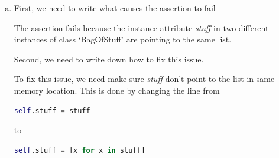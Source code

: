 \documentclass[12pt]{article}
\begin{document}
\begin{enumerate}[a.]
    \item

    First, we need to write what causes the assertion to fail

    \bigskip

    The assertion fails because the instance attribute \textit{stuff} in two
    different instances of class `BagOfStuff' are pointing to the same list.

    \bigskip

    Second, we need to write down how to fix this issue.

    \bigskip

    To fix this issue, we need make sure \textit{stuff} don't point to the list in
    same memory location. This is done by changing the line from

    \bigskip

    \begin{lstlisting}[language=python]
    self.stuff = stuff
    \end{lstlisting}

    to

    \begin{lstlisting}[language=python]
    self.stuff = [x for x in stuff]
    \end{lstlisting}



\end{enumerate}
\end{document}
